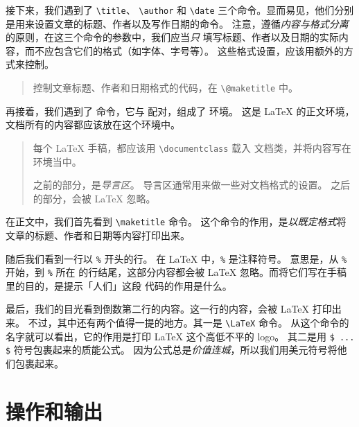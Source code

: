 接下来，我们遇到了 \lstinline[style = iltx]|\title|、
\lstinline[style = iltx]|\author| 和 \lstinline[style = iltx]|\date|
三个命令。显而易见，他们分别是用来设置文章的标题、作者以及写作日期的命令。
注意，遵循\emph{内容与格式分离}的原则，在这三个命令的参数中，我们应当\emph{只}%
填写标题、作者以及日期的实际内容，而不应包含它们的格式（如字体、字号等）。
这些格式设置，应该用额外的方式来控制。

\begin{quote}
  控制文章标题、作者和日期格式的代码，在 \lstinline[style = iltx]|\@maketitle| 中。
\end{quote}

再接着，我们遇到了 \lstinline[style = iltx]|| 命令，它与
\lstinline[style = iltx]|| 配对，组成了  环境。
这是 \LaTeX{} 的正文环境，文档所有的内容都应该放在这个环境中。

\begin{quote}
  每个 \LaTeX{} 手稿，都应该用 \lstinline[style = iltx]|\documentclass| 载入
  文档类，并将内容写在  环境当中。

  \lstinline[style = iltx]|| 之前的部分，是\emph{导言区}。
  导言区通常用来做一些对文档格式的设置。
  \lstinline[style = iltx]|| 之后的部分，会被 \LaTeX{} 忽略。
\end{quote}

在正文中，我们首先看到 \lstinline[style = iltx]|\maketitle| 命令。
这个命令的作用，是\emph{以既定格式}将文章的标题、作者和日期等内容打印出来。

随后我们看到一行以 \lstinline[style = iltx]|%| 开头的行。
在 \LaTeX{} 中，\lstinline[style = iltx]|%| 是注释符号。
意思是，从 \lstinline[style = iltx]|%| 开始，到 \lstinline[style = iltx]|%| 所在
的行结尾，这部分内容都会被 \LaTeX{} 忽略。而将它们写在手稿里的目的，是提示「人们」这段
代码的作用是什么。

最后，我们的目光看到倒数第二行的内容。这一行的内容，会被 \LaTeX{} 打印出来。
不过，其中还有两个值得一提的地方。其一是 \lstinline[style = iltx]|\LaTeX| 命令。
从这个命令的名字就可以看出，它的作用是打印 \LaTeX{} 这个高低不平的 logo。
其二是用 \lstinline[style = iltx]|$ ... $| 符号包裹起来的质能公式。
因为公式总是\emph{价值连城}，所以我们用美元符号将他们包裹起来。

\section{操作和输出}

